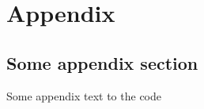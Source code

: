 \appendix 
\section*{Appendix}
\renewcommand{\thesubsection}{\Alph{subsection}}

\subsection*{Some appendix section}
Some appendix text to the code
